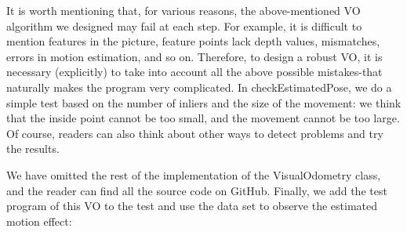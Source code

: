 It is worth mentioning that, for various reasons, the above-mentioned VO algorithm we designed may fail at each step. For example, it is difficult to mention features in the picture, feature points lack depth values, mismatches, errors in motion estimation, and so on. Therefore, to design a robust VO, it is necessary (explicitly) to take into account all the above possible mistakes-that naturally makes the program very complicated. In checkEstimatedPose, we do a simple test based on the number of inliers and the size of the movement: we think that the inside point cannot be too small, and the movement cannot be too large. Of course, readers can also think about other ways to detect problems and try the results.

We have omitted the rest of the implementation of the VisualOdometry class, and the reader can find all the source code on GitHub. Finally, we add the test program of this VO to the test and use the data set to observe the estimated motion effect:

